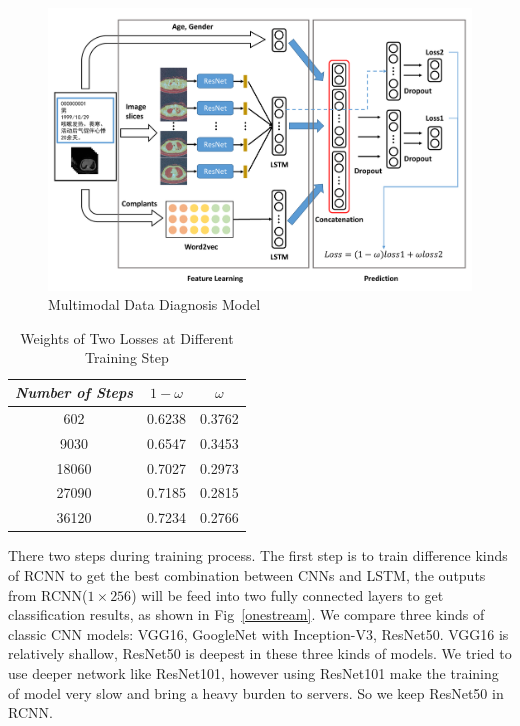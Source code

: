 \documentclass[runningheads]{llncs}
\begin{document}
\begin{figure}[htb]
    \centerline{\includegraphics[width=130mm]{MMDD.pdf}}
    \vspace{-0cm}
    \caption{Multimodal Data Diagnosis Model}
    \vspace{-0cm}
    \label{MMDD}
    \end{figure}

\begin{table}[htb]
    \vspace{-0cm}
    \caption{Weights of Two Losses at Different Training Step}
    \vspace{-0cm}
    \begin{center}
    \begin{tabular}{|c|c|c|}
    \hline
    \textbf{\textit{Number of Steps}} & \textbf{\textit{$1 - \omega$}} & \textbf{\textit{$\omega$}}\\
    \hline
    602 &0.6238 & 0.3762  \\
    9030 &0.6547 & 0.3453  \\
    18060 &0.7027 & 0.2973  \\
    27090 &0.7185 & 0.2815  \\
    36120 &0.7234 & 0.2766  \\

    \hline
    \end{tabular}
    \vspace{-0cm}
    \label{weights}
    \end{center}
    \vspace{-0cm}
    \end{table}

There two steps during training process.
The first step is to train difference kinds of RCNN to get the best combination between CNNs and LSTM, the outputs from RCNN($1 \times 256$) will be feed into two fully connected layers to get classification results, as shown in Fig~\ref{onestream}. We compare three kinds of classic CNN models: VGG16, GoogleNet with Inception-V3, ResNet50. VGG16 is relatively shallow, ResNet50 is deepest in these three kinds of models. We tried to use deeper network like ResNet101, however using ResNet101 make the training of model very slow and bring a heavy burden to servers. So we keep ResNet50 in RCNN.
\end{document}
